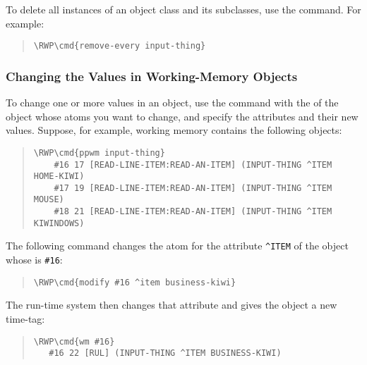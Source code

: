 To delete all instances of an object class and its subclasses, use the
 command. For example:

\begin{quote}
\begin{Verbatim}[commandchars=\\\{\}]
\RWP\cmd{remove-every input-thing}
\end{Verbatim}
\end{quote}

\subsubsection{Changing the Values in Working-Memory Objects}

To change one or more values in an object, use the  command with
the  of the object whose atoms you want to change, and
specify the attributes and their new values.  Suppose, for example,
working memory contains the following objects:

\begin{quote}
\begin{Verbatim}[commandchars=\\\{\}]
\RWP\cmd{ppwm input-thing}
    #16 17 [READ-LINE-ITEM:READ-AN-ITEM] (INPUT-THING ^ITEM HOME-KIWI)
    #17 19 [READ-LINE-ITEM:READ-AN-ITEM] (INPUT-THING ^ITEM MOUSE)
    #18 21 [READ-LINE-ITEM:READ-AN-ITEM] (INPUT-THING ^ITEM KIWINDOWS)
\end{Verbatim}
\end{quote}

The following command changes the atom for the attribute \verb|^ITEM|
of the object whose  is \verb|#16|:

\begin{quote}
\begin{Verbatim}[commandchars=\\\{\}]
\RWP\cmd{modify #16 ^item business-kiwi}
\end{Verbatim}
\end{quote}

The run-time system then changes that attribute and gives the object a
new time-tag:

\begin{quote}
\begin{Verbatim}[commandchars=\\\{\}]
\RWP\cmd{wm #16}
   #16 22 [RUL] (INPUT-THING ^ITEM BUSINESS-KIWI)
\end{Verbatim}
\end{quote}

